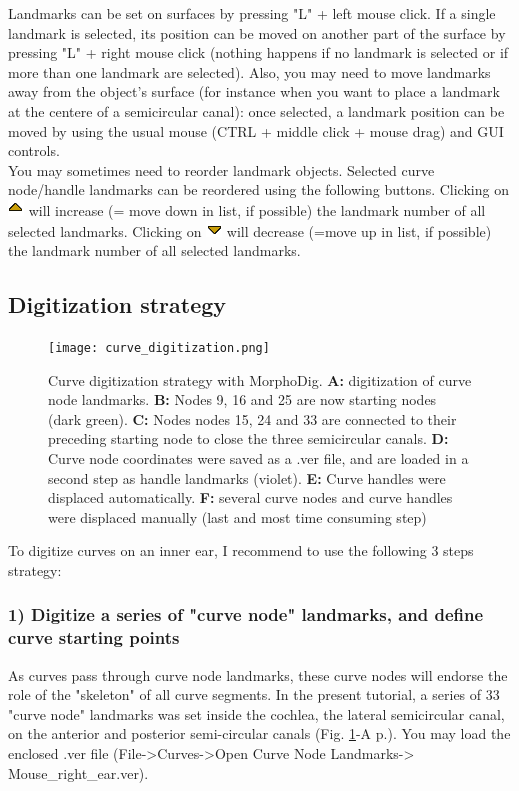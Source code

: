 \documentclass[12pt, a4paper]{book}
\begin{document}
Landmarks can be set on surfaces by pressing "L" + left mouse click. If a single landmark is selected, its position can be moved
on another part of the surface by pressing "L" + right mouse click (nothing happens if no landmark
is selected or if more than one landmark are selected). Also, you may need to move landmarks away
from the object's surface (for instance when you want to place a landmark at the centere of a semicircular canal):
once selected, a landmark position can be moved by using the usual mouse (CTRL + middle click + mouse drag) and GUI controls.\\

You may sometimes need to reorder landmark objects. 
Selected curve node/handle landmarks can be reordered
using the following buttons. Clicking on \includegraphics[scale=0.7]{../images/06/objects/move_up.png} will increase (= move down in list, if possible) the landmark number of all selected landmarks. Clicking on \includegraphics[scale=0.7]{../images/06/objects/move_down.png} will decrease (=move up in list, if possible) the landmark number of all selected landmarks. 

\subsection{Digitization strategy}
\begin{figure}
  \centering
  \texttt{[image: curve\_digitization.png]} 
	\caption{Curve digitization strategy with MorphoDig. \textbf{A:} digitization of curve node landmarks. \textbf{B:} Nodes 9, 16 and 25 are now starting nodes (dark green). \textbf{C:} Nodes nodes 15, 24 and 33 are connected to their preceding starting node to close the three semicircular canals. \textbf{D:} Curve node coordinates were saved  as a .ver file, and are loaded in a second step as handle landmarks (violet). \textbf{E:} Curve handles were displaced automatically. \textbf{F:} several curve nodes and curve handles were displaced manually (last and most time consuming step)}
\label{curve_digitization}
 \end{figure}
To digitize curves on an inner ear, I recommend to use the following 3 steps strategy:
\subsubsection{1) Digitize a series of "curve node" landmarks, and define curve starting points}
As curves pass through curve node landmarks, these curve nodes will endorse the role of the "skeleton" of all curve segments. In the present tutorial, a series of 33 "curve node" landmarks was set inside the cochlea, the lateral semicircular canal, on the anterior and posterior semi-circular canals (Fig. \ref{curve_digitization}-A p.\pageref{curve_digitization}). You may load the enclosed .ver file (File->Curves->Open Curve Node Landmarks-> Mouse\_right\_ear.ver).\\
\end{document}
